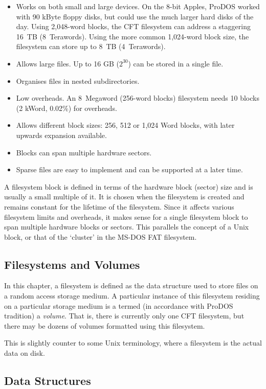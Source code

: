 \begin{itemize}
\item Works on both small and large devices. On the 8-bit Apples,
  ProDOS worked with 90 kByte floppy disks, but could use the much
  larger hard disks of the day. Using 2,048-word blocks, the CFT
  filesystem can address a staggering 16~TB (8~Terawords). Using the
  more common 1,024-word block size, the filesystem can store up to
  8~TB (4~Terawords).
\item Allows large files. Up to 16 GB ($2^{30}$) can be stored in a single
  file.
\item Organises files in nested subdirectories.
\item Low overheads. An 8~Megaword (256-word blocks) filesystem needs 10 blocks
  (2 kWord, 0.02\%) for overheads.
\item Allows different block sizes: 256, 512 or 1,024 Word blocks,
  with later upwards expansion available.
\item Blocks can span multiple hardware sectors.
\item Sparse files are easy to implement and can be supported at a later time.
\end{itemize}

A filesystem block is defined in terms of the hardware block (sector) size and
is usually a small multiple of it. It is chosen when the filesystem is created
and remains constant for the lifetime of the filesystem. Since it affects
various filesystem limits and overheads, it makes sense for a single filesystem
block to span multiple hardware blocks or sectors. This parallels the concept
of a Unix block, or that of the ‘cluster’ in the MS-DOS FAT filesystem.

\subsection{Filesystems and Volumes}

In this chapter, a filesystem is defined as the data structure used to store
files on a random access storage medium. A particular instance of this
filesystem residing on a particular storage medium is a termed (in accordance
with ProDOS tradition) a {\em volume\/}. That is, there is currently only one
CFT filesystem, but there may be dozens of volumes formatted using this
filesystem.

This is slightly counter to some Unix terminology, where a filesystem is the
actual data on disk.

\subsection{Data Structures}

